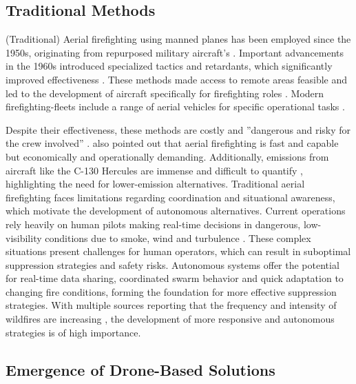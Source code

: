 \documentclass[11pt, a4paper]{article}
\begin{document}
\subsection{Traditional Methods}

(Traditional) Aerial firefighting using manned planes has been employed since the 1950s, originating from repurposed military aircraft's \citep{janney2012airtankers}. Important advancements in the 1960s introduced specialized tactics and retardants, which significantly improved effectiveness \citep{struminskaFlightPerformanceAnalysis2024}.
These methods made access to remote areas feasible and led to the development of aircraft specifically for firefighting roles \citep{struminskaFlightPerformanceAnalysis2024,LockheedSuperHercules}. Modern firefighting-fleets include a range of aerial vehicles for specific operational tasks \citep{FleetInformationFirefighting}. 

Despite their effectiveness, these methods are costly and ''dangerous and risky for the crew involved'' \citep[p. 1896]{struminskaFlightPerformanceAnalysis2024}. \citet{struminskaFlightPerformanceAnalysis2024} also pointed out that aerial firefighting is fast and capable but economically and operationally demanding. Additionally, emissions from aircraft like the C-130 Hercules are immense and difficult to quantify \citep{LockheedC130Hercules2022,spicerRapidMeasurementEmissions2009}, highlighting the need for lower-emission alternatives.
Traditional aerial firefighting faces limitations regarding coordination and situational awareness, which motivate the development of autonomous alternatives. Current operations rely heavily on human pilots making real-time decisions in dangerous, low-visibility conditions due to smoke, wind and turbulence \citep{struminskaFlightPerformanceAnalysis2024}. These complex situations present challenges for human operators, which can result in suboptimal suppression strategies and safety risks. Autonomous systems offer the potential for real-time data sharing, coordinated swarm behavior and quick adaptation to changing fire conditions, forming the foundation for more effective suppression strategies. With multiple sources reporting that the frequency and intensity of wildfires are increasing \citep{copernicus-wildfires,IPCC2023,grassland_Wildfires}, the development of more responsive and autonomous strategies is of high importance.

\subsection{Emergence of Drone-Based Solutions}
\end{document}
